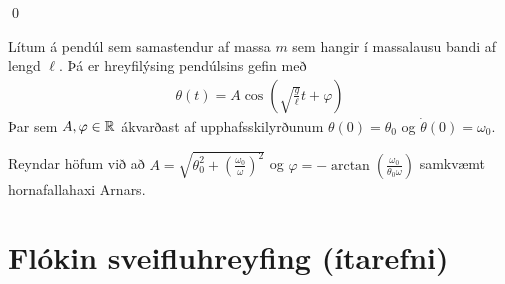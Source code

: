 \ifdefined \wholebook \else\documentclass[oneside]{book}\usepackage{EdlBook}\graphicspath{{figures/}}
\begin{document}
\qed

\begin{tcolorbox}
\begin{theorem}
Lítum á pendúl sem samastendur af massa $m$ sem hangir í massalausu bandi af lengd $\ell$. Þá er hreyfilýsing pendúlsins gefin með
\begin{align*}
    \theta(t) = A \cos(\sqrt{\frac{g}{\ell}}t + \varphi)
\end{align*}
Þar sem $A, \varphi \in \mathbb{R}$ ákvarðast af upphafsskilyrðunum $\theta(0) = \theta_0$ og $\dot{\theta}(0) = \omega_0$.
\end{theorem}
\end{tcolorbox}
Reyndar höfum við að $A = \sqrt{\theta_0^2 + \left(\frac{\omega_0}{\omega}\right)^2}$ og $\varphi = -\arctan(\frac{\omega_0}{\theta_0 \omega})$ samkvæmt hornafallahaxi Arnars.

\section{Flókin sveifluhreyfing (ítarefni)}
\end{document}
